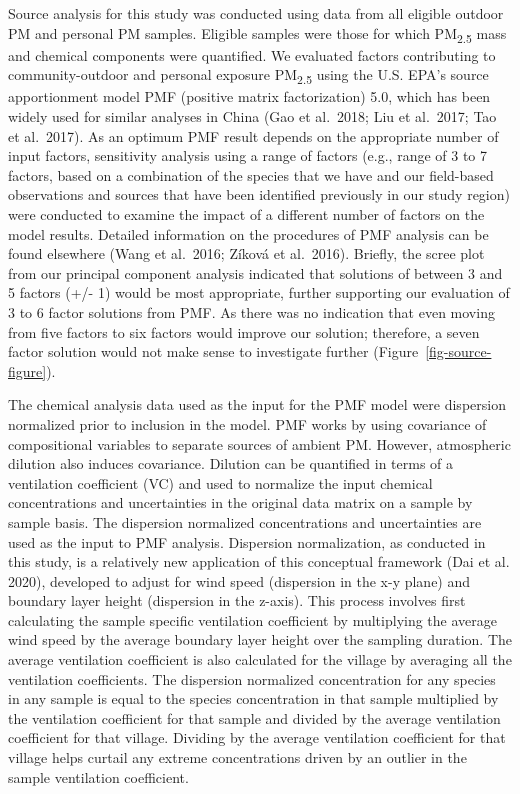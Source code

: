 \documentclass[
  letterpaper,
  DIV=11,
  numbers=noendperiod]{scrartcl}
\begin{document}
Source analysis for this study was conducted using data from all
eligible outdoor PM and personal PM samples. Eligible samples were those
for which PM\textsubscript{2.5} mass and chemical components were
quantified. We evaluated factors contributing to community-outdoor and
personal exposure PM\textsubscript{2.5} using the U.S. EPA's source
apportionment model PMF (positive matrix factorization) 5.0, which has
been widely used for similar analyses in China (Gao et al.~2018; Liu et
al.~2017; Tao et al.~2017). As an optimum PMF result depends on the
appropriate number of input factors, sensitivity analysis using a range
of factors (e.g., range of 3 to 7 factors, based on a combination of the
species that we have and our field-based observations and sources that
have been identified previously in our study region) were conducted to
examine the impact of a different number of factors on the model
results. Detailed information on the procedures of PMF analysis can be
found elsewhere (Wang et al.~2016; Zíková et al.~2016). Briefly, the
scree plot from our principal component analysis indicated that
solutions of between 3 and 5 factors (+/- 1) would be most appropriate,
further supporting our evaluation of 3 to 6 factor solutions from PMF.
As there was no indication that even moving from five factors to six
factors would improve our solution; therefore, a seven factor solution
would not make sense to investigate further
(Figure~\ref{fig-source-figure}).

The chemical analysis data used as the input for the PMF model were
dispersion normalized prior to inclusion in the model. PMF works by
using covariance of compositional variables to separate sources of
ambient PM. However, atmospheric dilution also induces covariance.
Dilution can be quantified in terms of a ventilation coefficient (VC)
and used to normalize the input chemical concentrations and
uncertainties in the original data matrix on a sample by sample basis.
The dispersion normalized concentrations and uncertainties are used as
the input to PMF analysis. Dispersion normalization, as conducted in
this study, is a relatively new application of this conceptual framework
(Dai et al. 2020), developed to adjust for wind speed (dispersion in the
x-y plane) and boundary layer height (dispersion in the z-axis). This
process involves first calculating the sample specific ventilation
coefficient by multiplying the average wind speed by the average
boundary layer height over the sampling duration. The average
ventilation coefficient is also calculated for the village by averaging
all the ventilation coefficients. The dispersion normalized
concentration for any species in any sample is equal to the species
concentration in that sample multiplied by the ventilation coefficient
for that sample and divided by the average ventilation coefficient for
that village. Dividing by the average ventilation coefficient for that
village helps curtail any extreme concentrations driven by an outlier in
the sample ventilation coefficient.
\end{document}
